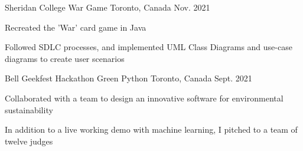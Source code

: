 \begin{cventries}
  \cventry
    {Sheridan College}
    {War Game}
    {Toronto, Canada}
    {Nov. 2021}
    {
      \begin{cvitems}
        \item {Recreated the 'War' card game in Java 
        \item Followed SDLC processes, and implemented UML Class Diagrams and use-case diagrams to create user scenarios}
      \end{cvitems}
    }
  \cventry
    {Bell Geekfest Hackathon}
    {Green Python}
    {Toronto, Canada}
    {Sept. 2021}
    {
      \begin{cvitems}
        \item {Collaborated with a team to design an innovative software for environmental sustainability
        \item In addition to a live working demo with machine learning, I pitched to a team of twelve judges}
      \end{cvitems}
    }
\end{cventries}
